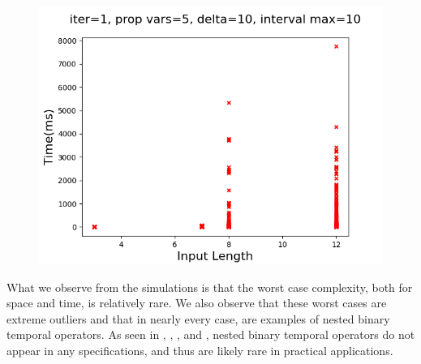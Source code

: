 \documentclass[runningheads]{llncs}
\begin{document}
\begin{minipage}{0.5 \textwidth}
    \begin{figure}[H]
    \centering
    \includegraphics[scale=0.35]{images/Sim4Time_large.png}
    \label{InLenVsRunTime4}
    \end{figure}
\end{minipage}
\noindent What we observe from the simulations is that the worst case complexity, both for space and time, is relatively rare. We also observe that these worst cases are extreme outliers and that in nearly every case, are examples of nested binary temporal operators. As seen in \cite{HLR21}, \cite{KZJZR20}, \cite{AJR22}, and \cite{HCHJR21}, nested binary temporal operators do not appear in any specifications, and thus are likely rare in practical applications.
\end{document}
